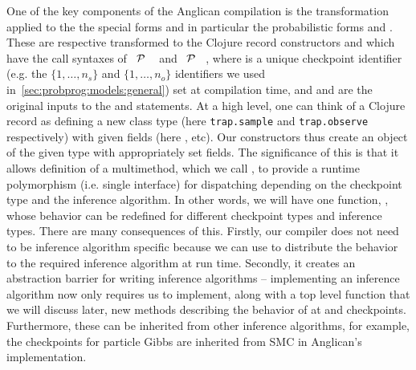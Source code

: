One of the key components of the Anglican compilation is the transformation applied to the
the special forms and in particular the probabilistic forms \sample and \observe.  These
are respective transformed to the Clojure record constructors \samplecps and \observecps 
which have the call syntaxes of
 ~$\mathcal{P}$ ~\angstate\clj{)} and  ~$\mathcal{P}$ ~\angstate\clj{)},
where  is a unique checkpoint identifier (e.g. the $\{1,\dots,n_s\}$ and $\{1,\dots,n_o\}$ identifiers
we used in~\ref{sec:probprog:models:general}) set at compilation time, and   and 
are the original inputs to the \sample and \observe statements.  At a high level, one can
think of a Clojure record as defining a new class type (here {\small \texttt{trap.sample}} and {\small \texttt{trap.observe}}
respectively) with given fields (here ,  etc).  Our constructors thus create
an object of the given type with appropriately set fields.  The significance of this is that
it allows definition of a multimethod, which we call \checkpoint, to provide a runtime polymorphism
(i.e. single interface) for dispatching depending on the checkpoint
type and the inference algorithm.  In other words, we will have one function, \checkpoint, whose
behavior can be redefined for different checkpoint types and inference types.  There are many
consequences of this.  Firstly, our compiler does not need to be inference algorithm specific
because we can use \checkpoint to distribute the behavior to the required inference algorithm
at run time.  Secondly, it creates an abstraction barrier for writing inference algorithms -- implementing
an inference algorithm now only requires us to implement, along with a top level function \anginfer that
we will discuss later, new methods describing the behavior of \checkpoint at \sample and \observe
checkpoints.  Furthermore, these can be inherited from other inference algorithms, for example,
the \observe checkpoints for particle Gibbs are inherited from SMC in Anglican's implementation.

